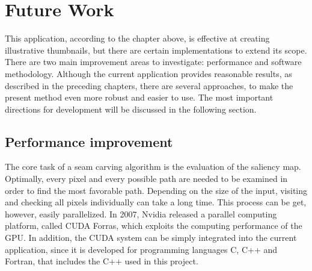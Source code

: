 \documentclass[draft,final]{vutinfth} %
\begin{document}
	\chapter{Future Work}
	This application, according to the chapter above, is effective at creating illustrative thumbnails, but there are certain implementations to extend its scope. 
	There are two main improvement areas to investigate: performance and software methodology.
	Although the current application provides reasonable results, as described in the preceding chapters, there are several approaches, to make the present method even more robust and easier to use.
	The most important directions for development will be discussed in the following section.
	
	\section{Performance improvement} 
	The core task of a seam carving algorithm is the evaluation of the saliency map.
	Optimally, every pixel and every possible path are needed to be examined in order to find the most favorable path.
	Depending on the size of the input, visiting and checking all pixels individually can take a long time.
	This process can be get, however, easily parallelized.
	In 2007, Nvidia released a parallel computing platform, called CUDA Forras, which exploits the computing performance of the GPU.
	In addition, the CUDA system can be simply integrated into the current application, since it is developed for programming languages C, C++ and Fortran, that includes the C++ used in this project.   
	
\end{document}
